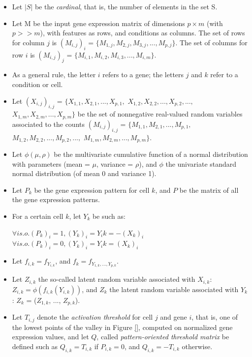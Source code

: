 \documentclass{report}
\begin{document}
{\begin{itemize}
\item Let $|S|$ be the \textit{cardinal}, that is, the number of elements in the set S.
\item Let M be the input gene expression matrix of dimensions $p \times m$ (with $p >> m$), with features as rows, and conditions as columns. The set of rows for column $j$ is $(M_{i,j})_i$ = $\{M_{1,j}, M_{2,j}, M_{3,j}, ..., M_{p,j}\}$. The set of columns for row $i$ is $(M_{i,j})_j$ = $\{M_{i,1}, M_{i,2}, M_{i,3}, ..., M_{i,m}\}$.
\item As a general rule, the letter $i$ refers to a gene; the letters $j$ and $k$ refer to a condition or cell.
\item Let $(X_{i,j})_{i,j}$ = $\{X_{1,1}, X_{2,1}, ..., X_{p,1},$ $X_{1,2}, X_{2,2}, ..., X_{p,2}, ...,$ $X_{1,m}, X_{2,m}, ..., X_{p,m}\}$ be the set of nonnegative real-valued random variables associated to the counts $(M_{i,j})_{i,j}$ = $\{M_{1,1}, M_{2,1}, ..., M_{p,1},$ $M_{1,2}, M_{2,2}, ..., M_{p,2}, ...,$ $M_{1,m}, M_{2,m}, ..., M_{p,m}\}$. 
\item Let $\phi(\mu, \rho)$ be the multivariate cumulative function of a normal distribution with parameters (mean = $\mu$, variance = $\rho$), and $\phi$ the univariate standard normal distribution (of mean 0 and variance 1).
\item Let $P_k$ be the gene expression pattern for cell $k$, and $P$ be the matrix of all the gene expression patterns. 
\item For a certain cell $k$, let $Y_k$ be such as:

     \begin{center}
     $\forall i s.o. (P_k)_i = 1, (Y_k)_i = Y_ik = -(X_k)_i$\\
     $\forall i s.o. (P_k)_i = 0, (Y_k)_i = Y_ik = (X_k)_i$
     \end{center}

\item Let $f_{i,k} = f_{Y_{i,k}}$, and $f_k = f_{Y_{1,k}, ..., Y_{p,k}}$.
\item Let $Z_{i,k}$ the so-called latent random variable associated with $X_{i,k}$: $Z_{i,k} = \phi(f_{i,k}(Y_{i,k}))$, and $Z_k$ the latent random variable associated with $Y_k$: $Z_k$ = ($Z_{1,k}$, ..., $Z_{p,k}$).
\item Let $T_{i, j}$ denote the \textit{activation threshold} for cell $j$ and gene $i$, that is, one of the lowest points of the valley in Figure \ref{}, computed on normalized gene expression values, and let $Q$, called \textit{pattern-oriented threshold matrix} be defined such as $Q_{i,k} = T_{i, k}$ if $P_{i,k} = 0$, and $Q_{i,k} = -T_{i, k}$ otherwise.
\end{itemize}

}
\end{document}
